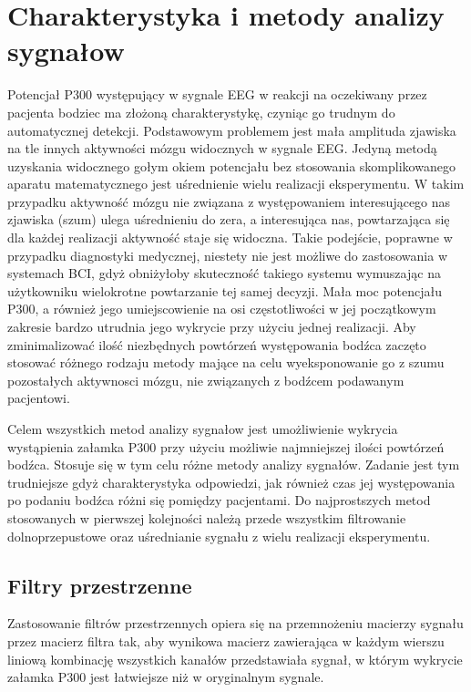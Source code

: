 \documentclass[licencjacka,openright]{pracamgr}
\begin{document}
\chapter{Charakterystyka i metody analizy sygnałow}
Potencjał P300 występujący w sygnale EEG w reakcji na oczekiwany przez pacjenta bodziec ma złożoną charakterystykę, czyniąc go trudnym do automatycznej detekcji. Podstawowym problemem jest mała amplituda zjawiska na tle innych aktywności mózgu widocznych w sygnale EEG. Jedyną metodą uzyskania widocznego gołym okiem potencjału bez stosowania skomplikowanego aparatu matematycznego jest uśrednienie wielu realizacji eksperymentu. W takim przypadku aktywność mózgu nie związana z występowaniem interesującego nas zjawiska (szum) ulega uśrednieniu do zera, a interesująca nas, powtarzająca się dla każdej realizacji aktywność staje się widoczna. Takie podejście, poprawne w przypadku diagnostyki medycznej, niestety nie jest możliwe do zastosowania w systemach BCI, gdyż obniżyłoby skuteczność takiego systemu wymuszając na użytkowniku wielokrotne powtarzanie tej samej decyzji. Mała moc potencjału P300, a również jego umiejscowienie na osi częstotliwości w jej początkowym zakresie bardzo utrudnia jego wykrycie przy użyciu jednej realizacji. Aby zminimalizować ilość niezbędnych powtórzeń występowania bodźca zaczęto stosować różnego rodzaju metody mające na celu wyeksponowanie go z szumu pozostałych aktywnosci mózgu, nie związanych z bodźcem podawanym pacjentowi.

Celem wszystkich metod analizy sygnałow jest umożliwienie wykrycia wystąpienia załamka P300 przy użyciu możliwie najmniejszej ilości powtórzeń bodźca. Stosuje się w tym celu różne metody analizy sygnałów. Zadanie jest tym trudniejsze gdyż charakterystyka odpowiedzi, jak również czas jej występowania po podaniu bodźca różni się pomiędzy pacjentami. Do najprostszych metod stosowanych w pierwszej kolejności należą przede wszystkim filtrowanie dolnoprzepustowe oraz uśrednianie sygnału z wielu realizacji eksperymentu.

\section{Filtry przestrzenne}
Zastosowanie filtrów przestrzennych opiera się na przemnożeniu macierzy sygnału przez macierz filtra tak, aby wynikowa macierz zawierająca w każdym wierszu liniową kombinację wszystkich kanałów przedstawiała sygnał, w którym wykrycie załamka P300 jest łatwiejsze niż w oryginalnym sygnale. 
\end{document}
